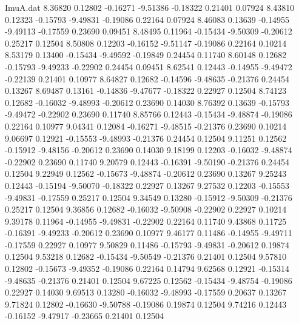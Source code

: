 \begin{filecontents}{ImuA.dat}
   8.36820    0.12802   -0.16271   -9.51386   -0.18322    0.21401    0.07924
   8.43810    0.12323   -0.15793   -9.49831   -0.19086    0.22164    0.07924
   8.46083    0.13639   -0.14955   -9.49113   -0.17559    0.23690    0.09451
   8.48495    0.11964   -0.15434   -9.50309   -0.20612    0.25217    0.12504
   8.50808    0.12203   -0.16152   -9.51147   -0.19086    0.22164    0.10214
   8.53179    0.13400   -0.15434   -9.49592   -0.19849    0.24454    0.11740
   8.60148    0.12682   -0.15793   -9.49233   -0.22902    0.24454    0.09451
   8.62541    0.12443   -0.14955   -9.49472   -0.22139    0.21401    0.10977
   8.64827    0.12682   -0.14596   -9.48635   -0.21376    0.24454    0.13267
   8.69487    0.13161   -0.14836   -9.47677   -0.18322    0.22927    0.12504
   8.74123    0.12682   -0.16032   -9.48993   -0.20612    0.23690    0.14030
   8.76392    0.13639   -0.15793   -9.49472   -0.22902    0.23690    0.11740
   8.85766    0.12443   -0.15434   -9.48874   -0.19086    0.22164    0.10977
   9.04341    0.12084   -0.16271   -9.48515   -0.21376    0.23690    0.10214
   9.06697    0.12921   -0.15553   -9.48993   -0.21376    0.24454    0.12504
   9.11251    0.12562   -0.15912   -9.48156   -0.20612    0.23690    0.14030
   9.18199    0.12203   -0.16032   -9.48874   -0.22902    0.23690    0.11740
   9.20579    0.12443   -0.16391   -9.50190   -0.21376    0.24454    0.12504
   9.22949    0.12562   -0.15673   -9.48874   -0.20612    0.23690    0.13267
   9.25243    0.12443   -0.15194   -9.50070   -0.18322    0.22927    0.13267
   9.27532    0.12203   -0.15553   -9.49831   -0.17559    0.25217    0.12504
   9.34549    0.13280   -0.15912   -9.50309   -0.21376    0.25217    0.12504
   9.36856    0.12682   -0.16032   -9.50908   -0.22902    0.22927    0.10214
   9.39178    0.11964   -0.14955   -9.49831   -0.22902    0.22164    0.11740
   9.43868    0.11725   -0.16391   -9.49233   -0.20612    0.23690    0.10977
   9.46177    0.11486   -0.14955   -9.49711   -0.17559    0.22927    0.10977
   9.50829    0.11486   -0.15793   -9.49831   -0.20612    0.19874    0.12504
   9.53218    0.12682   -0.15434   -9.50549   -0.21376    0.21401    0.12504
   9.57810    0.12802   -0.15673   -9.49352   -0.19086    0.22164    0.14794
   9.62568    0.12921   -0.15314   -9.48635   -0.21376    0.21401    0.12504
   9.67225    0.12562   -0.15434   -9.48754   -0.19086    0.22927    0.14030
   9.69513    0.13280   -0.16032   -9.48993   -0.17559    0.20637    0.13267
   9.71824    0.12802   -0.16630   -9.50788   -0.19086    0.19874    0.12504
   9.74216    0.12443   -0.16152   -9.47917   -0.23665    0.21401    0.12504

\end{filecontents}
